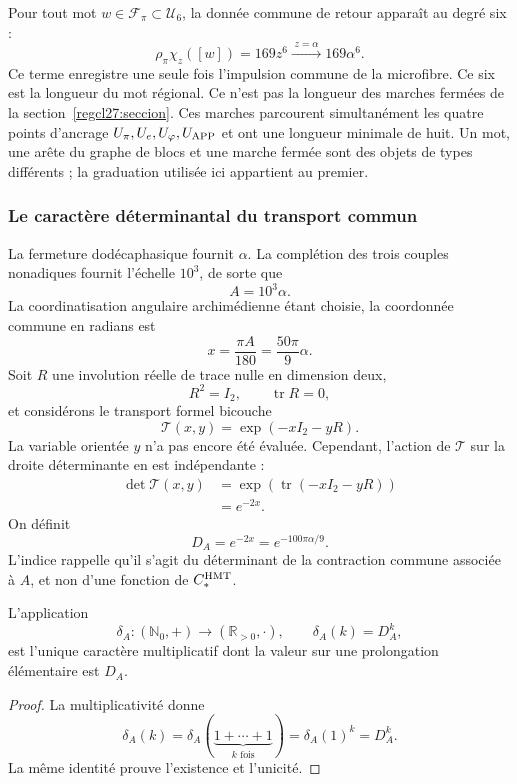 Pour tout mot \(w\in\mathcal F_\pi\subset\mathcal U_6\), la donnée commune de retour apparaît au degré six :
\[
\rho_\pi\chi_z([w])=169z^6
\xrightarrow{\;z=\alpha\;}169\alpha^6.
\]
Ce terme enregistre une seule fois l'impulsion commune de la microfibre.
Ce six est la longueur du mot régional. Ce n'est pas la longueur des
marches fermées de la section~\ref{regcl27:seccion}. Ces marches parcourent
simultanément les quatre points d'ancrage
\(U_\pi,U_e,U_\varphi,U_{\rm APP}\) et ont une longueur minimale de huit. Un
mot, une arête du graphe de blocs et une marche fermée sont des objets de
types différents ; la graduation utilisée ici appartient au premier.

\subsubsection{Le caractère déterminantal du transport commun}

La fermeture dodécaphasique fournit \(\alpha\). La complétion des trois
couples nonadiques fournit l'échelle \(10^3\), de sorte que
\[
A=10^3\alpha.
\]
La coordinatisation angulaire archimédienne étant choisie, la coordonnée commune en radians est
\[
x=\frac{\pi A}{180}=\frac{50\pi}{9}\alpha.
\]
Soit \(R\) une involution réelle de trace nulle en dimension deux,
\[
R^2=I_2,
\qquad
\operatorname{tr}R=0,
\]
et considérons le transport formel bicouche
\[
\mathcal T(x,y)=\exp(-xI_2-yR).
\]
La variable orientée \(y\) n'a pas encore été évaluée. Cependant, l'action
de \(\mathcal T\) sur la droite déterminante en est indépendante :
\[
\begin{aligned}
\det\mathcal T(x,y)
&=\exp\!\left(\operatorname{tr}(-xI_2-yR)\right)\\
&=e^{-2x}.
\end{aligned}
\]
On définit
\[
\boxed{
D_A=e^{-2x}=e^{-100\pi\alpha/9}.}
\]
L'indice rappelle qu'il s'agit du déterminant de la contraction commune associée à \(A\), et non d'une fonction de \(C_*^{\rm HMT}\).

\begin{proposition}
\label{p12-83-c13-s3:prop:caracter-determinante}
L'application
\[
\delta_A:(\mathbb N_0,+)\longrightarrow(\mathbb R_{>0},\cdot),
\qquad
\delta_A(k)=D_A^k,
\]
est l'unique caractère multiplicatif dont la valeur sur une prolongation
élémentaire est \(D_A\).
\end{proposition}

\begin{proof}
La multiplicativité donne
\[
\delta_A(k)
=\delta_A(\underbrace{1+\cdots+1}_{k\text{ fois}})
=\delta_A(1)^k=D_A^k.
\]
La même identité prouve l'existence et l'unicité.
\end{proof}


